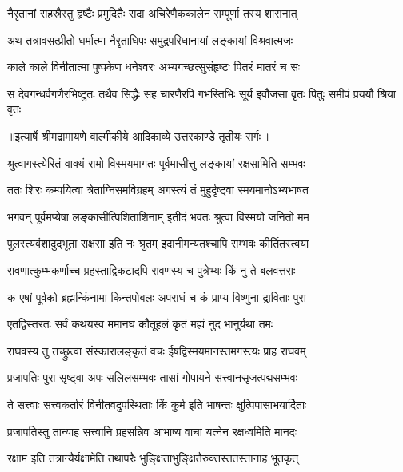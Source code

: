 \twolineshloka
{नैरृतानां सहस्रैस्तु हृष्टैः प्रमुदितैः सदा}
{अचिरेणैककालेन सम्पूर्णा तस्य शासनात्} %

\twolineshloka
{अथ तत्रावसत्प्रीतो धर्मात्मा नैरृताधिपः}
{समुद्रपरिधानायां लङ्कायां विश्रवात्मजः} %

\twolineshloka
{काले काले विनीतात्मा पुष्पकेण धनेश्वरः}
{अभ्यगच्छत्सुसंहृष्टः पितरं मातरं च सः} %

\fourlineindentedshloka
{स देवगन्धर्वगणैरभिष्टुतः}
{तथैव सिद्धैः सह चारणैरपि}
{गभस्तिभिः सूर्य इवौजसा वृतः}
{पितुः समीपं प्रययौ श्रिया वृतः} %


{॥इत्यार्षे श्रीमद्रामायणे वाल्मीकीये आदिकाव्ये उत्तरकाण्डे तृतीयः सर्गः॥}


\twolineshloka
{श्रुत्वागस्त्येरितं वाक्यं रामो विस्मयमागतः}
{पूर्वमासीत्तु लङ्कायां रक्षसामिति सम्भवः} %

\twolineshloka
{ततः शिरः कम्पयित्वा त्रेताग्निसमविग्रहम्}
{अगस्त्यं तं मुहुर्दृष्ट्वा स्मयमानोऽभ्यभाषत} %

\twolineshloka
{भगवन् पूर्वमप्येषा लङ्कासीत्पिशिताशिनाम्}
{इतीदं भवतः श्रुत्वा विस्मयो जनितो मम} %

\twolineshloka
{पुलस्त्यवंशादुद्भूता राक्षसा इति नः श्रुतम्}
{इदानीमन्यतश्चापि सम्भवः कीर्तितस्त्वया} %

\twolineshloka
{रावणात्कुम्भकर्णाच्च प्रहस्ताद्विकटादपि}
{रावणस्य च पुत्रेभ्यः किं नु ते बलवत्तराः} %

\twolineshloka
{क एषां पूर्वको ब्रह्मन्किंनामा किन्तपोबलः}
{अपराधं च कं प्राप्य विष्णुना द्राविताः पुरा} %

\twolineshloka
{एतद्विस्तरतः सर्वं कथयस्व ममानघ}
{कौतूहलं कृतं मह्यं नुद भानुर्यथा तमः} %

\twolineshloka
{राघवस्य तु तच्छ्रुत्वा संस्कारालङ्कृतं वचः}
{ईषद्विस्मयमानस्तमगस्त्यः प्राह राघवम्} %

\twolineshloka
{प्रजापतिः पुरा सृष्ट्वा अपः सलिलसम्भवः}
{तासां गोपायने सत्त्वानसृजत्पद्मसम्भवः} %

\twolineshloka
{ते सत्त्वाः सत्त्वकर्तारं विनीतवदुपस्थिताः}
{किं कुर्म इति भाषन्तः क्षुत्पिपासाभयार्दिताः} %

\twolineshloka
{प्रजापतिस्तु तान्याह सत्त्वानि प्रहसन्निव}
{आभाष्य वाचा यत्नेन रक्षध्वमिति मानदः} %

\twolineshloka
{रक्षाम इति तत्रान्यैर्यक्षामेति तथापरैः}
{भुङ्क्षिताभुङ्क्षितैरुक्तस्ततस्तानाह भूतकृत्} %

